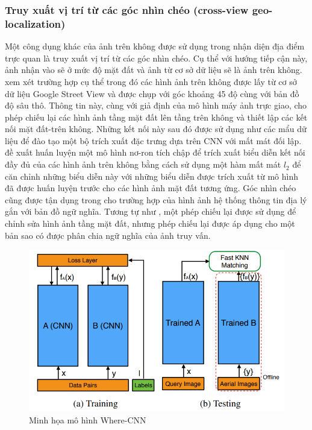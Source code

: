 \subsubsection{Truy xuất vị trí từ các góc nhìn chéo (cross-view geo-localization)}
Một công dụng khác của ảnh trên không được sử dụng trong nhận diện địa điểm trực quan là truy xuất vị trí từ các góc nhìn chéo. Cụ thể với hướng tiếp cận này, ảnh nhận vào sẽ ở mức độ mặt đất và ảnh từ cơ sở dữ liệu sẽ là ảnh trên không. \cite{Lin2015LearningDR} xem xét trường hợp cụ thể trong đó các hình ảnh trên không được lấy từ cơ sở dữ liệu Google Street View và được chụp với góc khoảng 45 độ cùng với bản đồ độ sâu thô. Thông tin này, cùng với giả định của mô hình máy ảnh trực giao, cho phép chiếu lại các hình ảnh tầng mặt đất lên tầng trên không và thiết lập các kết nối mặt đất-trên không. Những kết nối này sau đó được sử dụng như các mẩu dữ liệu để đào tạo một bộ trích xuất đặc trưng dựa trên CNN với mất mát đối lập. \cite{workman2015widearea} đề xuất huấn luyện một mô hình nơ-ron tích chập để trích xuất biểu diễn kết nối đầy đủ của các hình ảnh trên không bằng cách sử dụng một hàm mất mát $l_2$ để căn chỉnh những biểu diễn này với những biểu diễn được trích xuất từ mô hình đã được huấn luyện trước cho các hình ảnh mặt đất tương ứng. Góc nhìn chéo cũng được tận dụng trong \cite{Castaldo2015SemanticCM} cho trường hợp của hình ảnh hệ thống thông tin địa lý gắn với bản đồ ngữ nghĩa. Tương tự như \cite{Lin2015LearningDR}, một phép chiếu lại được sử dụng để chỉnh sửa hình ảnh tầng mặt đất, nhưng phép chiếu lại được áp dụng cho một bản sao có được phân chia ngữ nghĩa của ảnh truy vấn.

\begin{figure}[H]
    \centering
    \includegraphics[width=\textwidth]{pics/Chapter2/wherecnn.png}
    \caption{Minh họa mô hình Where-CNN \cite{Lin2015LearningDR}}
\end{figure}